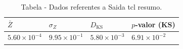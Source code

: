 \begin{table}[H]
\centering
\caption{Tabela - Dados referentes a Saida tcl resumo.}
\label{tab:saida_tcl_resumo}
\begin{tabular}{llll}
\toprule
$\bar{Z}$ & $\sigma_Z$ & $D_{\mathrm{KS}}$ & $p$-valor (KS) \\
\midrule
$\displaystyle 5.60 \times 10^{-4}$ & $\displaystyle 9.95 \times 10^{-1}$ & $\displaystyle 5.80 \times 10^{-3}$ & $\displaystyle 6.91 \times 10^{-2}$ \\
\bottomrule
\end{tabular}

\end{table}
